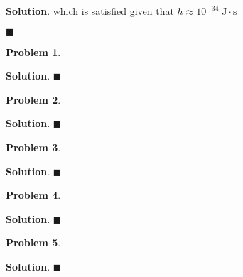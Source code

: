 \documentclass[12pt]{article}
\newtheorem{p}{Problem}
\theoremstyle{definition}
\newenvironment{s}{%
        \begin{trivlist} \item \textbf{Solution}. }{%
            \hspace*{\fill} $\blacksquare$\end{trivlist}}%
\begin{document}
{\begin{s}
which is satisfied given that $\hbar \approx 10^{-34} \;\mathrm{J\cdot s}$



\end{s}

\begin{p}

\end{p}

\begin{s} 
\end{s}

\begin{p}

\end{p}

\begin{s} 
\end{s}

\begin{p}

\end{p}

\begin{s} 
\end{s}

\begin{p}

\end{p}

\begin{s} 
\end{s}

\begin{p}

\end{p}

\begin{s} 
\end{s}
\end{document}
